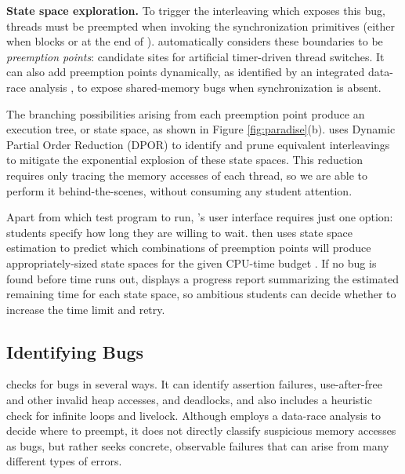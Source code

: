 {\bf State space exploration.}
To trigger the interleaving which exposes this bug, threads must be preempted when invoking the synchronization primitives (either when  blocks or at the end of ).
\landslide automatically considers these boundaries to be {\em preemption points}:
candidate sites for artificial timer-driven thread switches.
It can also add preemption points dynamically,
as identified by an integrated data-race analysis \cite{hybriddatarace,fasttrack},
to expose shared-memory bugs when synchronization is absent.

The branching possibilities arising from each preemption point produce an execution tree, or state space,
as shown in Figure \ref{fig:paradise}(b).
\landslide uses Dynamic Partial Order Reduction (DPOR) \cite{dpor} to identify and prune equivalent interleavings
to mitigate the exponential explosion of these state spaces.
This reduction requires only tracing the memory accesses of each thread,
so we are able to perform it behind-the-scenes, without consuming any student attention.

Apart from which test program to run, \landslide's user interface requires just one option:
students specify how long they are willing to wait.
\landslide then uses state space estimation \cite{estimation-anonymized} to predict
which combinations of preemption points will produce appropriately-sized state spaces for the given CPU-time budget \cite{quicksand-anonymized}.
If no bug is found before time runs out, \landslide displays a progress report summarizing the estimated remaining time for each state space,
so ambitious students can decide whether to increase the time limit and retry.

\subsection{Identifying Bugs}

\landslide checks for bugs in several ways.
It can identify assertion failures, use-after-free and other invalid heap accesses, and
deadlocks, and also includes a heuristic check for infinite loops and livelock.
Although \landslide employs a data-race analysis to decide where to preempt,
it does not directly classify suspicious memory accesses as bugs,
but rather seeks concrete, observable failures that can arise from many different types of errors.

